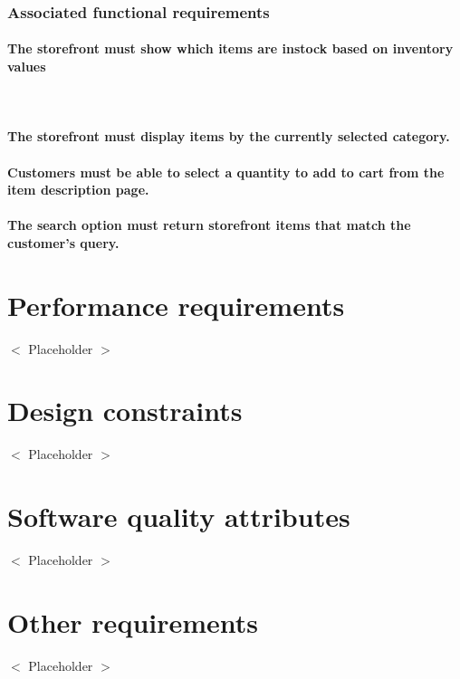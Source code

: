 \documentclass{scrreprt}
\begin{document}
\subsubsection{Associated functional requirements}
\paragraph[]{\normalfont The storefront must show which items are instock based on inventory values}
~\\
\paragraph[]{\normalfont The storefront must display items by the currently selected category.}
\paragraph[]{\normalfont Customers must be able to select a quantity to add to cart from the item description page.}
\paragraph[]{\normalfont The search option must return storefront items that match the customer’s query.}

\section{Performance requirements}
$<$ Placeholder $>$

\section{Design constraints}
$<$ Placeholder $>$


\section{Software quality attributes}
$<$ Placeholder $>$

\section{Other requirements}
$<$ Placeholder $>$
\end{document}
